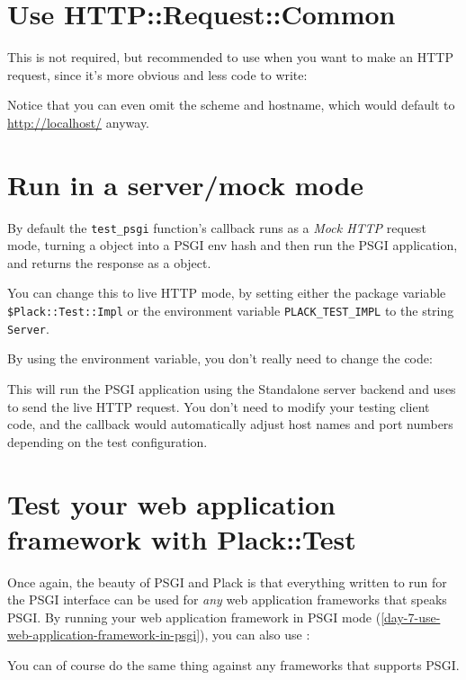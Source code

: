\section{Use HTTP::Request::Common}\label{use-httprequestcommon}

This is not required, but recommended to use
\href{http://search.cpan.org/perldoc?HTTP::Request::Common}{}
when you want to make an HTTP request, since it's more obvious and less
code to write:


Notice that you can even omit the scheme and hostname, which would
default to \url{http://localhost/} anyway.

\section{Run in a server/mock mode}\label{run-in-a-servermock-mode}

By default the \lstinline!test_psgi! function's callback runs as a
\emph{Mock HTTP} request mode, turning a  object into a
PSGI env hash and then run the PSGI application, and returns the
response as a  object.

You can change this to live HTTP mode, by setting either the package
variable \lstinline!$Plack::Test::Impl! or the environment variable
\lstinline!PLACK_TEST_IMPL! to the string \lstinline!Server!.


By using the environment variable, you don't really need to change the
 code:


This will run the PSGI application using the Standalone server backend
and uses  to send the live HTTP request. You don't need to
modify your testing client code, and the callback would automatically
adjust host names and port numbers depending on the test configuration.

\section{Test your web application framework with
Plack::Test}\label{test-your-web-application-framework-with-placktest}

Once again, the beauty of PSGI and Plack is that everything written to
run for the PSGI interface can be used for \emph{any} web application
frameworks that speaks PSGI. By running your web application framework 
in PSGI mode (\autoref{day-7-use-web-application-framework-in-psgi}), 
you can also use :


You can of course do the same thing against any frameworks that supports
PSGI.

